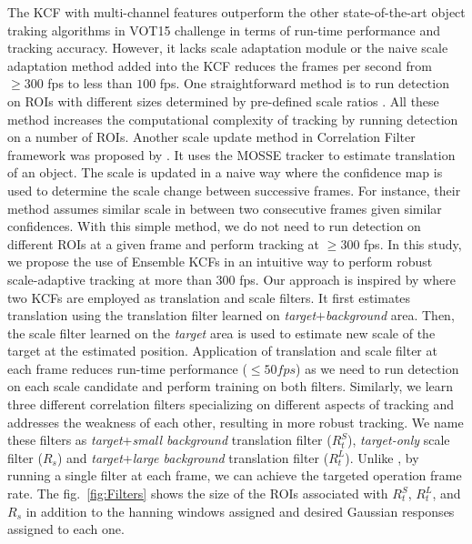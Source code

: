 \documentclass[10pt,twocolumn,letterpaper]{article}
\newcounter{ct}
\begin{document}
The KCF with multi-channel features outperform the other
state-of-the-art object traking algorithms in VOT15 challenge in terms of run-time
performance and tracking accuracy. However, it lacks scale adaptation
module or the naive scale adaptation method added into the KCF reduces
the frames per second from $\geq300$ fps to less than $100$ fps. One
straightforward method is to run detection on ROIs with different
sizes determined by pre-defined scale ratios
\cite{henriques2015high,tang2015multi,ma2015long,bibi2015multi,li2014scale}. All
these method increases the computational complexity of tracking by
running detection on a number of ROIs. Another scale update method in
Correlation Filter framework was proposed by \cite{zhang2014fast}. It
uses the MOSSE tracker to estimate translation of an object. The scale
is updated in a naive way where the confidence map is used to
determine the scale change between successive frames. For instance,
their method assumes similar scale in between two consecutive frames
given similar confidences. With this simple method, we do not need to
run detection on different ROIs at a given frame and perform tracking
at $\geq300$ fps. In this study, we propose the use of Ensemble KCFs
in an intuitive way to perform robust scale-adaptive tracking at more
than $300$ fps. Our approach is inspired by \cite{ma2015long} where
two KCFs are employed as translation and scale filters. It first
estimates translation using the translation filter learned on
\textit{target}$+$\textit{background} area. Then, the scale filter
learned on the \textit{target} area is used to estimate new scale of
the target at the estimated position. Application of translation and
scale filter at each frame reduces run-time performance ($\leq50 fps$)
as we need to run detection on each scale candidate and perform training on both filters. Similarly,
we learn three different correlation filters specializing on different
aspects of tracking and addresses the weakness of each other,
resulting in more robust tracking. We name these filters as
\textit{target}+\textit{small background} translation filter
($R_{t}^{S}$), \textit{target-only} scale filter ($R_{s}$) and
\textit{target}+\textit{large background} translation filter
($R_{t}^{L}$). Unlike \cite{ma2015long}, by running a single filter at
each frame, we can achieve the targeted operation frame rate. The
fig.~\ref{fig:Filters} shows the size of the ROIs associated with
$R_{t}^{S}$, $R_{t}^{L}$, and $R_{s}$ in addition to the hanning
windows assigned and desired Gaussian responses assigned to each one.
\end{document}
